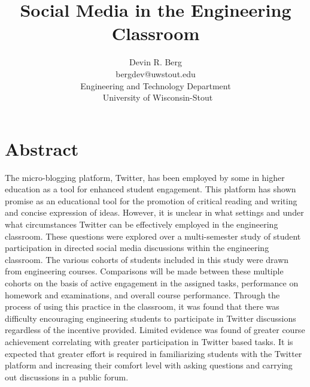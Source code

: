 \documentclass[12pt]{article}
\title{Social Media in the Engineering Classroom} %
\author{\vspace{-5ex}}
\author{\normalsize Devin R. Berg\\
\normalsize bergdev@uwstout.edu\\
\normalsize Engineering and Technology Department\\\
\normalsize University of Wisconsin-Stout}
\date{\vspace{-5ex}} %
\begin{document}
\raggedright
\maketitle
\thispagestyle{empty}
\pagestyle{empty}

\section*{Abstract}
The micro-blogging platform, Twitter, has been employed by some in higher education as a tool for enhanced student engagement. This platform has shown promise as an educational tool for the promotion of critical reading and writing and concise expression of ideas. However, it is unclear in what settings and under what circumstances Twitter can be effectively employed in the engineering classroom. These questions were explored over a multi-semester study of student participation in directed social media discussions within the engineering classroom. The various cohorts of students included in this study were drawn from engineering courses. Comparisons will be made between these multiple cohorts on the basis of active engagement in the assigned tasks, performance on homework and examinations, and overall course performance. Through the process of using this practice in the classroom, it was found that there was difficulty encouraging engineering students to participate in Twitter discussions regardless of the incentive provided. Limited evidence was found of greater course achievement correlating with greater participation in Twitter based tasks. It is expected that greater effort is required in familiarizing students with the Twitter platform and increasing their comfort level with asking questions and carrying out discussions in a public forum.
\end{document}
